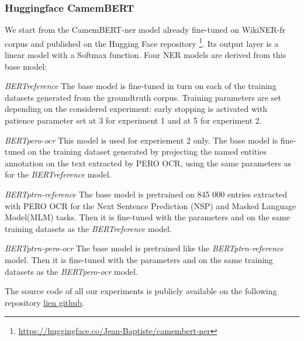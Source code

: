 
\subsubsection{Huggingface CamemBERT}
We start from the CamemBERT-ner model already fine-tuned on WikiNER-fr corpus and published on the Hugging Face repository \footnote{\url{https://huggingface.co/Jean-Baptiste/camembert-ner}}. Its output layer is a linear model with a Softmax function. Four NER models are derived from this base model: 

\textit{BERTreference} The base model is fine-tuned in turn on each of the training datasets generated from the groundtruth corpus. Training parameters are set depending on the considered experiment: early stopping is activated with patience parameter set at 3 for experiment 1 and at 5 for experiment 2. 

\textit{BERTpero-ocr} This model is used for experiement 2 only. The base model is fine-tuned on the training dataset generated by projecting the named entities annotation on the text extracted by PERO OCR, using the same parameters as for the \textit{BERTreference} model.

\textit{BERTptrn-reference} The base model is pretrained on 845 000 entries extracted with PERO OCR for the Next  Sentence  Prediction  (NSP) and  Masked  Language  Model(MLM) tasks. Then it is fine-tuned with the parameters and on the same training datasets as the \textit{BERTreference} model.

\textit{BERTptrn-pero-ocr} The base model is pretrained like the \textit{BERTptrn-reference} model. Then it is fine-tuned with the parameters and on the same training datasets as the \textit{BERTpero-ocr} model.

The source code of all our experiments is publicly available on the following repository \url{lien github}.
